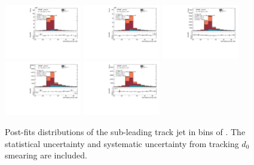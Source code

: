 \begin{figure}[htbp]
  \centering
 \includegraphics[width=0.3\textwidth]{figures/gbb/Sub_Sd0_Fits/Canv_Fit_0-Zp_T-01_coarse_y.pdf}
 \includegraphics[width=0.3\textwidth]{figures/gbb/Sub_Sd0_Fits/Canv_Fit_01-Zp_T-02_coarse_y.pdf}
 \includegraphics[width=0.3\textwidth]{figures/gbb/Sub_Sd0_Fits/Canv_Fit_02-Zp_T-03_coarse_y.pdf}\\
 \includegraphics[width=0.3\textwidth]{figures/gbb/Sub_Sd0_Fits/Canv_Fit_03-Zp_T-04_coarse_y.pdf}
 \includegraphics[width=0.3\textwidth]{figures/gbb/Sub_Sd0_Fits/Canv_Fit_04-Zp_T-05_coarse_y.pdf}

\caption{Post-fits \subsdzero distributions of the sub-leading track jet in bins of \zpt. The statistical uncertainty and systematic uncertainty from tracking $d_0$ smearing are included.}
  \label{fig:ZpT-postfits-subleading-sub}
\end{figure}



